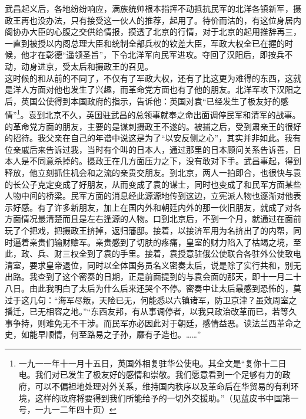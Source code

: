 武昌起义后，各地纷纷响应，满族统帅根本指挥不动抵抗民军的北洋各镇新军，摄政王再也没办法，只有接受这一伙人的推荐，起用了。待价而沽的，有这位身居内阁协办大臣的心腹之交供给情报，摸透了北京的行情，对于北京的起用推辞再三，一直到被授以内阁总理大臣和统制全部兵权的钦差大臣，军政大权全已在握的时候，他才在彰德“遥领圣旨”，下令北洋军向民军进攻。夺回了汉阳后，即按兵不动，动身进京，受太后和摄政王的召见。\\

这时候的和从前的不同了，不仅有了军政大权，还有了比这更为难得的东西，这就是洋人方面对他也发生了兴趣，而革命党方面也有了他的朋友。北洋军攻下汉阳之后，英国公使得到本国政府的指示，告诉他：英国对袁“已经发生了极友好的感情”\footnote{一九一一年十一月十五日，英国外相复驻华公使电。其全文是“复你十二日电。我们对已发生了极友好的感情和崇敬。我们愿意看到一个足够有力的政府，可以不偏袒地处理对外关系，维持国内秩序以及革命后在华贸易的有利环境，这样的政府将要得到我们所能给予的一切外交援助。”（见蓝皮书中国第一号，一九一二年四十页）}。袁到北京不久，英国驻武昌的总领事就奉之命出面调停民军和清军的战事。的革命党方面的朋友，主要的是谋刺摄政王不遂的。被捕之后，受到肃亲王的很好的招待。我父亲在自己的年谱中说这是为了“以安反侧之心”，其实并非如此。我有位亲戚后来告诉过我，当时有个叫的日本人，通过那里的日本顾问关系告诉善，日本人是不同意杀掉的。摄政王在几方面压力之下，没有敢对下手。武昌事起，得到释放，他立刻抓住机会和之流的亲贵交朋友。到北京，两人一拍即合，也很快与袁的长公子克定变成了好朋友，从而变成了袁的谋士，同时也变成了和民军方面某些人物中间的桥梁。民军方面的消息经此源源地传到这边，立宪派人物也逐渐对他表示好感。有了许多新朋友，加上在国内外和朝廷内外的那一伙旧朋友，就成了对各方面情况最清楚而且是左右逢源的人物。口到北京后，不到一个月，就通过在面前玩了个把戏，把摄政王挤掉，返归藩邸。接着，以接济军用为名挤出了的内帮，同时逼着亲贵们输财赡军。亲贵感到了切肤的疼痛，皇室的财力陷入了枯竭之境，至此，政、兵、财三权全到了袁的手里。接着，袁授意驻俄公使联合各驻外公使致电清室，要求皇帝退位，同时以全体国务员名义密奏太后，说是除了实行共和，别无出路。我查到了这个密奏的日期，正是前面提到的与袁会面的那天，即十一月二十八日。由此我明白了太后为什么后来还哭个不停。密奏中让太后最感到恐怖的，莫过于这几句：“海军尽叛，天险已无，何能悉以六镇诸军，防卫京津？虽效周室之播迁，已无相容之地。”“东西友邦，有从事调停者，以我只政治改革而已，若等久事争持，则难免无不干涉。而民军亦必因此对于朝廷，感情益恶。读法兰西革命之史，如能早顺情，何至路易之子孙，靡有孑造也。……”\\

